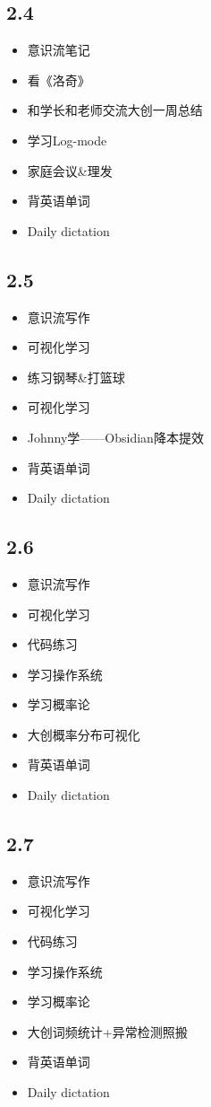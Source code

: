 \documentclass[UTF8]{ctexart}
\begin{document}
\subsection*{2.4}
\begin{itemize}
    \item 意识流笔记
    \item 看《洛奇》
    \item 和学长和老师交流大创一周总结
    \item 学习Log-mode
    \item 家庭会议\&理发
    \item 背英语单词
    \item Daily dictation
\end{itemize}
\subsection*{2.5}
\begin{itemize}
    \item 意识流写作
    \item 可视化学习
    \item 练习钢琴\&打篮球
    \item 可视化学习
    \item Johnny学——Obsidian降本提效
    \item 背英语单词
    \item Daily dictation
\end{itemize}
\subsection*{2.6}
\begin{itemize}
    \item 意识流写作
    \item 可视化学习
    \item 代码练习
    \item 学习操作系统
    \item 学习概率论
    \item 大创概率分布可视化
    \item 背英语单词
    \item Daily dictation
\end{itemize}
\subsection*{2.7}
\begin{itemize}
    \item 意识流写作
    \item 可视化学习
    \item 代码练习
    \item 学习操作系统
    \item 学习概率论
    \item 大创词频统计+异常检测照搬
    \item 背英语单词
    \item Daily dictation
\end{itemize}
\end{document}
